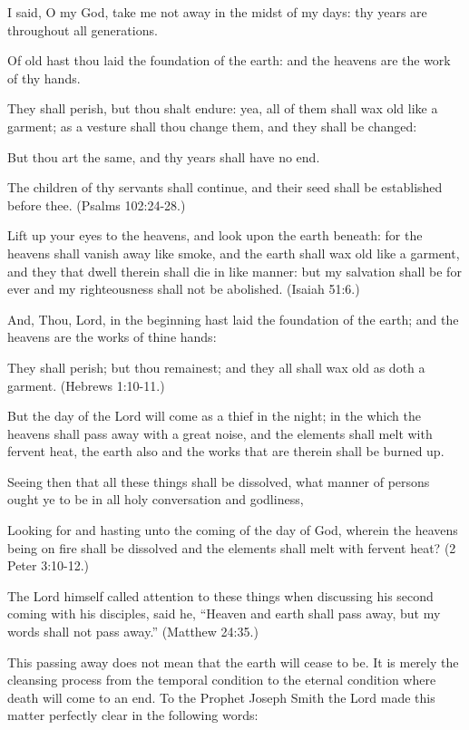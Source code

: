 I said, O my God, take me not away in the midst of my days: thy years are throughout all
generations.

Of old hast thou laid the foundation of the earth: and the heavens are the work of thy hands.

They shall perish, but thou shalt endure: yea, all of them shall wax old like a garment; as a
vesture shall thou change them, and they shall be changed:

But thou art the same, and thy years shall have no end.
 
The children of thy servants shall continue, and their seed shall be established before thee.
(Psalms 102:24-28.)

Lift up your eyes to the heavens, and look upon the earth beneath: for the heavens shall
vanish away like smoke, and the earth shall wax old like a garment, and they that dwell
therein shall die in like manner: but my salvation shall be for ever and my righteousness shall
not be abolished. (Isaiah 51:6.)

And, Thou, Lord, in the beginning hast laid the foundation of the earth; and the heavens are
the works of thine hands:

They shall perish; but thou remainest; and they all shall wax old as doth a garment. (Hebrews
1:10-11.)

But the day of the Lord will come as a thief in the night; in the which the heavens shall pass
away with a great noise, and the elements shall melt with fervent heat, the earth also and the
works that are therein shall be burned up.

Seeing then that all these things shall be dissolved, what manner of persons ought ye to be in
all holy conversation and godliness,

Looking for and hasting unto the coming of the day of God, wherein the heavens being on
fire shall be dissolved and the elements shall melt with fervent heat? (2 Peter 3:10-12.)

The Lord himself called attention to these things when discussing his second coming with his
disciples, said he, ``Heaven and earth shall pass away, but my words shall not pass away.''
(Matthew 24:35.)

This passing away does not mean that the earth will cease to be. It is merely the cleansing
process from the temporal condition to the eternal condition where death will come to an end.
To the Prophet Joseph Smith the Lord made this matter perfectly clear in the following
words:

